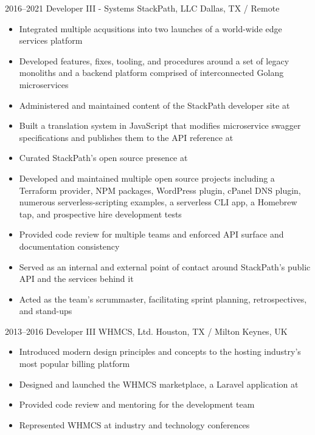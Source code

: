 \documentclass[11pt,a4paper,sans]{moderncv}
\begin{document}
    \cventry
      {2016--2021}
      {Developer III - Systems}
      {StackPath, LLC}
      {Dallas, TX / Remote}
      {}
      {
        \begin{itemize}
          \item Integrated multiple acqusitions into two launches of a world-wide edge services platform
          \item Developed features, fixes, tooling, and procedures around a set of legacy monoliths and a backend platform comprised of interconnected Golang microservices
          \item Administered and maintained content of the StackPath developer site at 
          \item Built a translation system in JavaScript that modifies microservice swagger specifications and publishes them to the API reference at 
          \item Curated StackPath's open source presence at 
          \item Developed and maintained multiple open source projects including a Terraform provider, NPM packages, WordPress plugin, cPanel DNS plugin, numerous serverless-scripting examples, a serverless CLI app, a Homebrew tap, and prospective hire development tests
          \item Provided code review for multiple teams and enforced API surface and documentation consistency
          \item Served as an internal and external point of contact around StackPath's public API and the services behind it
          \item Acted as the team's scrummaster, facilitating sprint planning, retrospectives, and stand-ups
        \end{itemize}
      }

    \cventry
      {2013--2016}
      {Developer III}
      {WHMCS, Ltd.}
      {Houston, TX / Milton Keynes, UK}
      {}
      {
        \begin{itemize}
          \item Introduced modern design principles and concepts to the hosting industry's most popular billing platform
          \item Designed and launched the WHMCS marketplace, a Laravel application at 
          \item Provided code review and mentoring for the development team
          \item Represented WHMCS at industry and technology conferences
        \end{itemize}
      }
\end{document}
